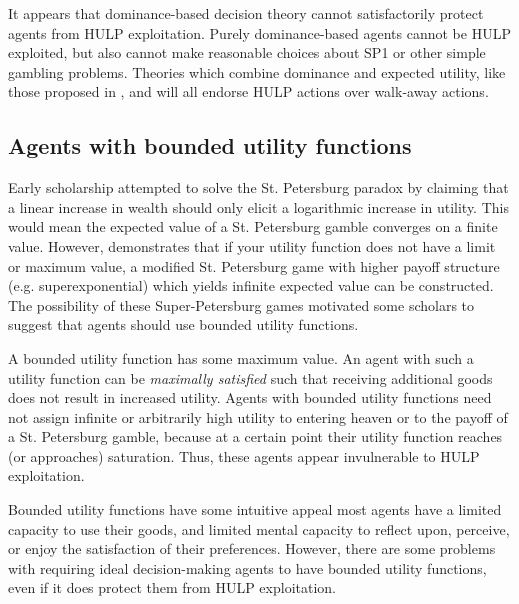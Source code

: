 \documentclass{article}
\begin{document}
It appears that dominance-based decision theory cannot satisfactorily protect agents from HULP exploitation. Purely dominance-based agents cannot be HULP exploited, but also cannot make reasonable choices about SP1 or other simple gambling problems. Theories which combine dominance and expected utility, like those proposed in \citep{colyvan2008relative}, \citep{colyvan2006no} and \citep{easwaran2009dominance} will all endorse HULP actions over walk-away actions. 

\subsection{Agents with bounded utility functions}

Early scholarship attempted to solve the St. Petersburg paradox by claiming that a linear increase in wealth should only elicit a logarithmic increase in utility. This would mean the expected value of a St. Petersburg gamble converges on a finite value. However, \citep{menger1934petersburg} demonstrates that if your utility function does not have a limit or maximum value, a modified St. Petersburg game with higher payoff structure (e.g. superexponential) which yields infinite expected value can be constructed. The possibility of these Super-Petersburg games motivated some scholars to suggest that agents should use bounded utility functions.

A bounded utility function has some maximum value. An agent with such a utility function can be \textit{maximally satisfied} such that receiving additional goods does not result in increased utility. Agents with bounded utility functions need not assign infinite or arbitrarily high utility to entering heaven or to the payoff of a St. Petersburg gamble, because at a certain point their utility function reaches (or approaches) saturation. Thus, these agents appear invulnerable to HULP exploitation. 

Bounded utility functions have some intuitive appeal \textemdash{} most agents have a limited capacity to use their goods, and limited mental capacity to reflect upon, perceive, or enjoy the satisfaction of their preferences. However, there are some problems with requiring ideal decision-making agents to have bounded utility functions, even if it does protect them from HULP exploitation.
\end{document}
